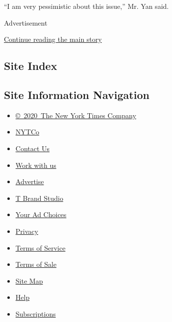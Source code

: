 ``I am very pessimistic about this issue,'' Mr. Yan said.

Advertisement

\protect\hyperlink{after-bottom}{Continue reading the main story}

\hypertarget{site-index}{%
\subsection{Site Index}\label{site-index}}

\hypertarget{site-information-navigation}{%
\subsection{Site Information
Navigation}\label{site-information-navigation}}

\begin{itemize}
\tightlist
\item
  \href{https://help.nytimes3xbfgragh.onion/hc/en-us/articles/115014792127-Copyright-notice}{©~2020~The
  New York Times Company}
\end{itemize}

\begin{itemize}
\tightlist
\item
  \href{https://www.nytco.com/}{NYTCo}
\item
  \href{https://help.nytimes3xbfgragh.onion/hc/en-us/articles/115015385887-Contact-Us}{Contact
  Us}
\item
  \href{https://www.nytco.com/careers/}{Work with us}
\item
  \href{https://nytmediakit.com/}{Advertise}
\item
  \href{http://www.tbrandstudio.com/}{T Brand Studio}
\item
  \href{https://www.nytimes3xbfgragh.onion/privacy/cookie-policy\#how-do-i-manage-trackers}{Your
  Ad Choices}
\item
  \href{https://www.nytimes3xbfgragh.onion/privacy}{Privacy}
\item
  \href{https://help.nytimes3xbfgragh.onion/hc/en-us/articles/115014893428-Terms-of-service}{Terms
  of Service}
\item
  \href{https://help.nytimes3xbfgragh.onion/hc/en-us/articles/115014893968-Terms-of-sale}{Terms
  of Sale}
\item
  \href{https://spiderbites.nytimes3xbfgragh.onion}{Site Map}
\item
  \href{https://help.nytimes3xbfgragh.onion/hc/en-us}{Help}
\item
  \href{https://www.nytimes3xbfgragh.onion/subscription?campaignId=37WXW}{Subscriptions}
\end{itemize}
